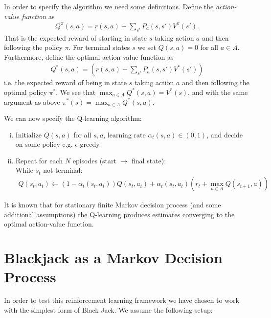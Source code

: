 In order to specify the algorithm we need some definitions. Define the \textit{action-value function} as
\begin{align} \label{eq:Qfun_policy}
	Q^{\pi} ( s,a  ) = r(s,a) + \sum_{s'} P_{a}(s,s')V^{\pi}(s').
\end{align}
That is the expected reward of starting in state $s$ taking action $a$ and then following the policy $\pi$. For terminal states $s$ we set $Q(s,a)=0$ for all $a\in A$. Furthermore, define the optimal action-value function as
\begin{align} \label{eq:Qfun_optimal}
Q^*  ( s,a  ) =  (r(s,a) + \sum_{s'} P_{a}(s,s')V^{* }(s'))
\end{align}
i.e. the expected reward of being in state $s$ taking action $a$ and then following the optimal policy $\pi^*$. We see that $\max_{a \in A} Q^*(s,a) = V^*(s)$, and 
with the same argument as above $\pi^*(s) = \max_{a \in A}Q^*(s,a)$. 

We can now specify the Q-learning algorithm:

\begin{enumerate}[(i)]
	\item Initialize $Q(s,a)$ for all $s,a$, learning rate $\alpha_t(s,a) \in (0,1)$, and decide on some policy e.g. $\epsilon$-greedy.
	\item Repeat for each $N$ episodes (start $\to$ final state): \\
	While $s_t$ not terminal:  
	\begin{align} \label{eq:Qupdate}
          Q(s_t,a_t)  \leftarrow (1-\alpha_t(s_t,a_t))Q(s_t,a_t) + \alpha_t(s_t,a_t)( r_t + \max_{a \in A} Q(s_{t+1},a) )
        \end{align}
\end{enumerate}
It is known that for stationary finite Markov decision process (and some additional assumptions) the Q-learning produces estimates converging to the optimal action-value function.


\section*{Blackjack as a Markov Decision Process}
In order to test this reinforcement learning framework we have chosen to work with the simplest form of Black Jack. We assume the following setup:

